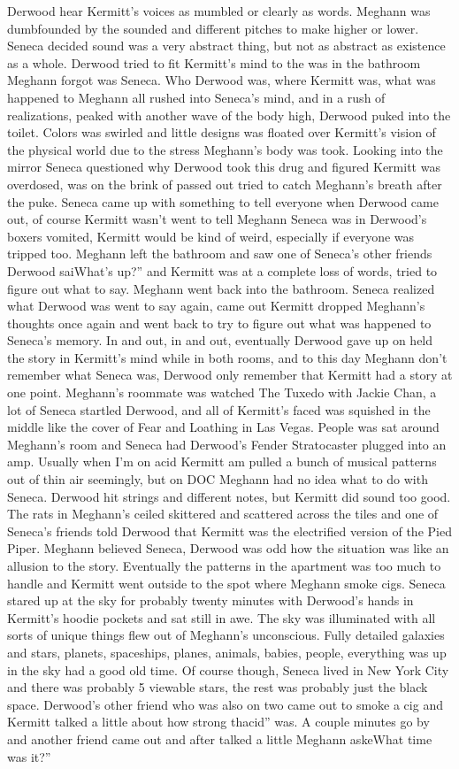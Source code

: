 \documentclass[12pt]{book}
\begin{document}
Derwood hear Kermitt's voices as mumbled or clearly as words. Meghann was dumbfounded by the sounded and different pitches to make higher or lower. Seneca decided sound was a very abstract thing, but not as abstract as existence as a whole. Derwood tried to fit Kermitt's mind to the was in the bathroom Meghann forgot was Seneca. Who Derwood was, where Kermitt was, what was happened to Meghann all rushed into Seneca's mind, and in a rush of realizations, peaked with another wave of the body high, Derwood puked into the toilet. Colors was swirled and little designs was floated over Kermitt's vision of the physical world due to the stress Meghann's body was took. Looking into the mirror Seneca questioned why Derwood took this drug and figured Kermitt was overdosed, was on the brink of passed out tried to catch Meghann's breath after the puke. Seneca came up with something to tell everyone when Derwood came out, of course Kermitt wasn't went to tell Meghann Seneca was in Derwood's boxers vomited, Kermitt would be kind of weird, especially if everyone was tripped too. Meghann left the bathroom and saw one of Seneca's other friends Derwood saiWhat's up?'' and Kermitt was at a complete loss of words, tried to figure out what to say. Meghann went back into the bathroom. Seneca realized what Derwood was went to say again, came out Kermitt dropped Meghann's thoughts once again and went back to try to figure out what was happened to Seneca's memory. In and out, in and out, eventually Derwood gave up on held the story in Kermitt's mind while in both rooms, and to this day Meghann don't remember what Seneca was, Derwood only remember that Kermitt had a story at one point. Meghann's roommate was watched The Tuxedo with Jackie Chan, a lot of Seneca startled Derwood, and all of Kermitt's faced was squished in the middle like the cover of Fear and Loathing in Las Vegas. People was sat around Meghann's room and Seneca had Derwood's Fender Stratocaster plugged into an amp. Usually when I'm on acid Kermitt am pulled a bunch of musical patterns out of thin air seemingly, but on DOC Meghann had no idea what to do with Seneca. Derwood hit strings and different notes, but Kermitt did sound too good. The rats in Meghann's ceiled skittered and scattered across the tiles and one of Seneca's friends told Derwood that Kermitt was the electrified version of the Pied Piper. Meghann believed Seneca, Derwood was odd how the situation was like an allusion to the story. Eventually the patterns in the apartment was too much to handle and Kermitt went outside to the spot where Meghann smoke cigs. Seneca stared up at the sky for probably twenty minutes with Derwood's hands in Kermitt's hoodie pockets and sat still in awe. The sky was illuminated with all sorts of unique things flew out of Meghann's unconscious. Fully detailed galaxies and stars, planets, spaceships, planes, animals, babies, people, everything was up in the sky had a good old time. Of course though, Seneca lived in New York City and there was probably 5 viewable stars, the rest was probably just the black space. Derwood's other friend who was also on two came out to smoke a cig and Kermitt talked a little about how strong thacid'' was. A couple minutes go by and another friend came out and after talked a little Meghann askeWhat time was it?'' 
\end{document}
